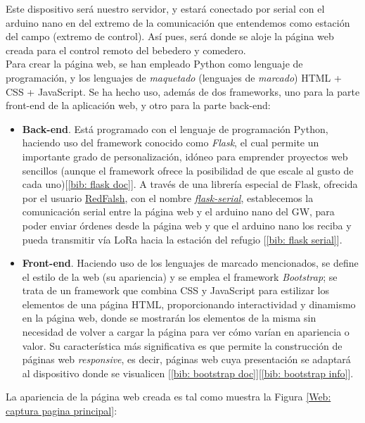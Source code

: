 \documentclass[12pt]{article}
\begin{document}
	\noindent Este dispositivo será nuestro servidor, y estará conectado por serial con el arduino nano en del extremo de la comunicación que entendemos como estación del campo (extremo de control). Así pues, será donde se aloje la página web creada para el control remoto del bebedero y comedero. \\
	
	\noindent Para crear la página web, se han empleado Python como lenguaje de programación, y los lenguajes de \textit{maquetado} (lenguajes de \textit{marcado}) HTML + CSS + JavaScript. Se ha hecho uso, además de dos frameworks, uno para la parte front-end de la aplicación web, y otro para la parte back-end:
	
	\begin{itemize}
		\item \textbf{Back-end}. Está programado con el lenguaje de programación Python, haciendo uso del framework conocido como \textit{Flask}, el cual permite un importante grado de personalización, idóneo para emprender proyectos web sencillos (aunque el framework ofrece la posibilidad de que escale al gusto de cada uno)[\ref{bib: flask doc}]. A través de una librería especial de Flask, ofrecida por el usuario \href{https://github.com/RedFalsh}{RedFalsh}, con el nombre \href{https://github.com/RedFalsh/flask-serial/blob/master/README.md}{\textit{flask-serial}}, establecemos la comunicación serial entre la página web y el arduino nano del GW, para poder enviar órdenes desde la página web y que el arduino nano los reciba y pueda transmitir vía LoRa hacia la estación del refugio [\ref{bib: flask serial}]. 
		\item \textbf{Front-end}. Haciendo uso de los lenguajes de marcado mencionados, se define el estilo de la web (su apariencia) y se emplea el framework \textit{Bootstrap}; se trata de un framework que combina CSS y JavaScript  para estilizar los elementos  de una página HTML, proporcionando interactividad  y dinamismo en la página web, donde se mostrarán los elementos de la misma sin necesidad de volver a cargar la página para ver cómo varían en apariencia o valor. Su característica más significativa es que permite la construcción de páginas web \textit{responsive}, es decir, páginas web cuya presentación se adaptará al dispositivo donde se visualicen [\ref{bib: bootstrap doc}][\ref{bib: bootstrap info}].
	\end{itemize} 
	
	\noindent La apariencia de la página web creada es tal como muestra la Figura \ref{Web: captura pagina principal}: \\
	
\end{document}

